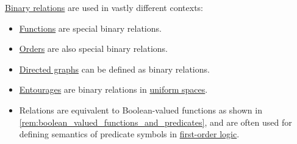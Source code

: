 \begin{example}\label{ex:def:binary_relation}
  \hyperref[def:binary_relation]{Binary relations} are used in vastly different contexts:
  \begin{itemize}
    \item \hyperref[def:function]{Functions} are special binary relations.
    \item \hyperref[ch:order_theory]{Orders} are also special binary relations.
    \item \hyperref[def:directed_graph]{Directed graphs} can be defined as binary relations.
    \item \hyperref[def:entourage]{Entourages} are binary relations in \hyperref[def:uniform_space]{uniform spaces}.
    \item Relations are equivalent to Boolean-valued functions as shown in \cref{rem:boolean_valued_functions_and_predicates}, and are often used for defining semantics of predicate symbols in \hyperref[sec:first_order_logic]{first-order logic}.
  \end{itemize}
\end{example}

